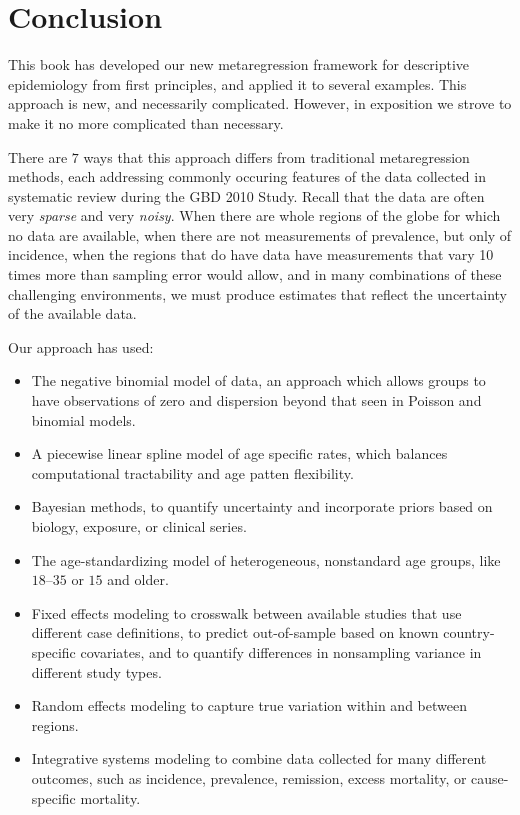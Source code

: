 \chapter{Conclusion}

This book has developed our new metaregression framework for
descriptive epidemiology from first principles, and applied it to
several examples.  This approach is new, and necessarily complicated.
However, in exposition we strove to make it no more complicated than
necessary.

There are $7$ ways that this approach differs from traditional
metaregression methods, each addressing commonly occuring features of
the data collected in systematic review during the GBD 2010 Study.
Recall that the data are often very \emph{sparse} and very
\emph{noisy}.  When there are whole regions of the globe for which no
data are available, when there are not measurements of prevalence, but
only of incidence, when the regions that do have data have
measurements that vary 10 times more than sampling error would allow,
and in many combinations of these challenging environments, we must
produce estimates that reflect the uncertainty of the available data.

Our approach has used:
\begin{itemize}
\item The negative binomial model of data, an approach which allows groups to have
observations of zero and dispersion beyond that seen in Poisson and binomial models.

\item A piecewise linear spline model of age specific rates, which balances computational
tractability and age patten flexibility.

\item Bayesian methods, to quantify uncertainty and incorporate priors
  based on biology, exposure, or clinical series.

\item The age-standardizing model of heterogeneous, nonstandard age groups, like $18$--$35$
or $15$ and older.

\item Fixed effects modeling to crosswalk between available studies that use
different case definitions, to predict out-of-sample based on known country-specific covariates, and to
quantify differences in nonsampling variance in different study types.

\item Random effects modeling to capture true variation within and between regions.

\item Integrative systems modeling to combine data collected for many different outcomes,
such as incidence, prevalence, remission, excess mortality, or
cause-specific mortality.
\end{itemize}


